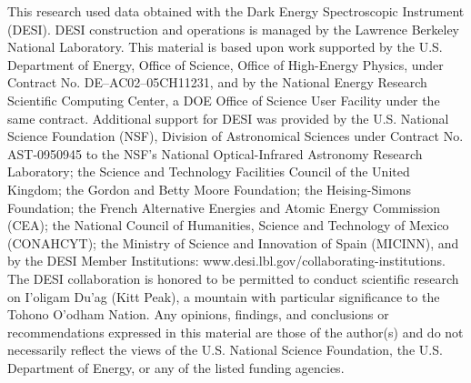 \documentclass[12pt, a4paper]{memoir}
\begin{document}
This research used data obtained with the Dark Energy Spectroscopic Instrument (DESI). DESI construction and operations is managed by the Lawrence Berkeley National Laboratory. This material is based upon work supported by the U.S. Department of Energy, Office of Science, Office of High-Energy Physics, under Contract No. DE–AC02–05CH11231, and by the National Energy Research Scientific Computing Center, a DOE Office of Science User Facility under the same contract. Additional support for DESI was provided by the U.S. National Science Foundation (NSF), Division of Astronomical Sciences under Contract No. AST-0950945 to the NSF’s National Optical-Infrared Astronomy Research Laboratory; the Science and Technology Facilities Council of the United Kingdom; the Gordon and Betty Moore Foundation; the Heising-Simons Foundation; the French Alternative Energies and Atomic Energy Commission (CEA); the National Council of Humanities, Science and Technology of Mexico (CONAHCYT); the Ministry of Science and Innovation of Spain (MICINN), and by the DESI Member Institutions: www.desi.lbl.gov/collaborating-institutions. The DESI collaboration is honored to be permitted to conduct scientific research on I’oligam Du’ag (Kitt Peak), a mountain with particular significance to the Tohono O’odham Nation. Any opinions, findings, and conclusions or recommendations expressed in this material are those of the author(s) and do not necessarily reflect the views of the U.S. National Science Foundation, the U.S. Department of Energy, or any of the listed funding agencies.

\newpage




\begin{appendices}





\end{appendices}


\end{document}
